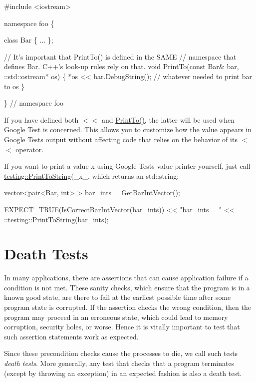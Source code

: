 \begin{DoxyCode}
#include <iostream>

namespace foo \{

class Bar \{ ... \};

// It's important that PrintTo() is defined in the SAME
// namespace that defines Bar.  C++'s look-up rules rely on that.
void PrintTo(const Bar& bar, ::std::ostream* os) \{
  *os << bar.DebugString();  // whatever needed to print bar to os
\}

\}  // namespace foo
\end{DoxyCode}


If you have defined both {\ttfamily $<$$<$} and {\ttfamily \hyperlink{namespacetesting_1_1internal_a8fd10cc30084c36a89c74868c8bd53f8}{Print\+To()}}, the latter will be used when Google Test is concerned. This allows you to customize how the value appears in Google Test\textquotesingle{}s output without affecting code that relies on the behavior of its {\ttfamily $<$$<$} operator.

If you want to print a value {\ttfamily x} using Google Test\textquotesingle{}s value printer yourself, just call {\ttfamily \hyperlink{namespacetesting_aa5717bb1144edd1d262d310ba70c82ed}{testing\+::\+Print\+To\+String}(}\+\_\+x\+\_\+{\ttfamily )}, which returns an {\ttfamily std\+::string}\+:


\begin{DoxyCode}
vector<pair<Bar, int> > bar\_ints = GetBarIntVector();

EXPECT\_TRUE(IsCorrectBarIntVector(bar\_ints))
    << "bar\_ints = " << ::testing::PrintToString(bar\_ints);
\end{DoxyCode}


\section*{Death Tests}

In many applications, there are assertions that can cause application failure if a condition is not met. These sanity checks, which ensure that the program is in a known good state, are there to fail at the earliest possible time after some program state is corrupted. If the assertion checks the wrong condition, then the program may proceed in an erroneous state, which could lead to memory corruption, security holes, or worse. Hence it is vitally important to test that such assertion statements work as expected.

Since these precondition checks cause the processes to die, we call such tests {\itshape death tests}. More generally, any test that checks that a program terminates (except by throwing an exception) in an expected fashion is also a death test.

